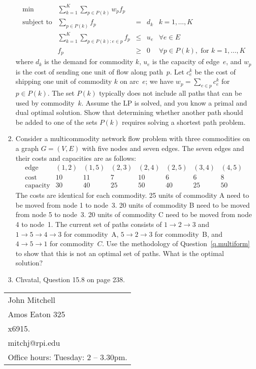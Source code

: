 \documentclass[12pt]{article}
\begin{document}
\begin{enumerate}
\begin{displaymath}
\begin{array}{lrcll}
\min & \sum_{k=1}^K \sum_{p \in P(k)} w_p f_p \\
\mbox{subject to} & \sum_{p \in P(k)} f_p & = & d_k & k = 1,\ldots,K  \\
& \sum_{k=1}^K \sum_{p \in P(k): e \in p} f_p & \leq & u_e & \forall e \in E  \\
& f_p & \geq & 0 & \forall p \in P(k), \mbox{ for } k=1,\ldots,K
\end{array}
\end{displaymath}
where $d_k$ is the demand for commodity $k$,
$u_e$ is the capacity of edge~$e$,
and $w_p$ is the cost of sending one unit of flow along path~$p$.
Let $c_e^k$ be the cost of shipping one unit of commodity $k$ on arc~$e$;
we have $w_p=\sum_{e \in p} c_e^k$ for $p \in P(k)$.
The set $P(k)$ typically does not include all paths that can be used by commodity~$k$.
Assume the LP is solved, and you know a primal and dual optimal solution.
Show that determining whether another path should be added to one of the
sets $P(k)$ requires solving a shortest path problem.

\item
Consider a multicommodity network flow problem with three commodities
on a graph $G=(V,E)$ with five nodes and seven edges.
The seven edges and their costs and capacities are as follows:
\begin{displaymath}
\begin{array}{l|rrrrrrr}
\mbox{edge} & (1,2) & (1,5) & (2,3) & (2,4) & (2,5) & (3,4) & (4,5) \\ \hline
\mbox{cost}   &  10  &  11 &  7 & 10 & 6 & 6 & 8 \\
\mbox{capacity} & 30 & 40 & 25 & 50 & 40 & 25 & 50
\end{array}
\end{displaymath}
The costs are identical for each commodity.
25 units of commodity A need to be moved from node 1 to node~3.
20 units of commodity B need to be moved from node 5 to node~3.
20 units of commodity C need to be moved from node 4 to node~1.
The current set of paths consists of $1 \rightarrow 2 \rightarrow 3$
and $1 \rightarrow 5 \rightarrow 4 \rightarrow 3$ for commodity~A,
$5 \rightarrow 2 \rightarrow 3$ for commodity~B,
and $4 \rightarrow 5 \rightarrow 1$ for commodity~$C$.
Use the methodology of Question~\ref{q.multiform} to show
that this is not an optimal set of paths.
What is the optimal solution?
\item
Chvatal, Question 15.8 on page 238.
\end{enumerate}


\vfill

\begin{tabular}{@{\hspace{.5in}}l}
   John Mitchell  \\
   Amos Eaton 325  \\
   x6915.  \\
   mitchj@rpi.edu  \\
   Office hours: Tuesday: 2 -- 3.30pm.
\end{tabular}
\end{document}
